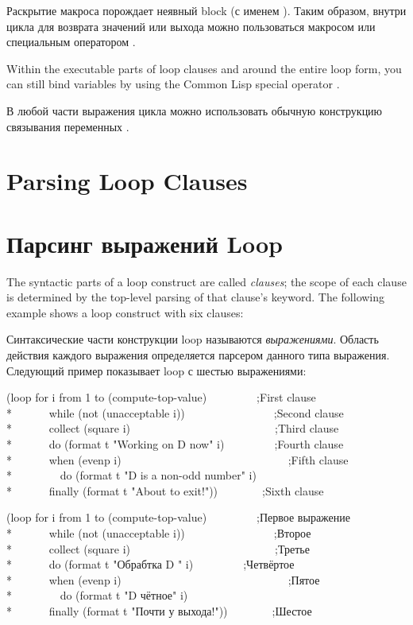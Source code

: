 Раскрытие макроса  порождает неявный block (с именем
). Таким образом, внутри цикла для возврата значений или
выхода можно пользоваться макросом  или специальным
оператором .

Within the executable parts of loop clauses and around the entire loop
form, you can still bind variables by using the Common Lisp special
operator .

В любой части выражения цикла можно использовать обычную конструкцию
связывания переменных .


\section{Parsing Loop Clauses}

\section{Парсинг выражений Loop}

The syntactic parts of a loop construct are called \emph{clauses}; the
scope of each clause is determined by the top-level parsing of that
clause's keyword.  The following example shows a loop construct with
six clauses:

Синтаксические части конструкции loop называются
\emph{выражениями}. Область действия каждого выражения определяется
парсером данного типа выражения. Следующий пример показывает loop с
шестью выражениями:

\begin{lisp} (loop for i from 1 to (compute-top-value)~~~~~~~~~;\textrm{First clause} \\*
~~~~~~while (not (unacceptable i))~~~~~~~~~~~~~~~~;\textrm{Second clause} \\*
~~~~~~collect (square i)~~~~~~~~~~~~~~~~~~~~~~~~~~;\textrm{Third clause} \\* 
~~~~~~do (format t "Working on {\Xtilde}D now" i)~~~~~~~~~;\textrm{Fourth clause} \\* 
~~~~~~when (evenp i)~~~~~~~~~~~~~~~~~~~~~~~~~~~~~~;\textrm{Fifth clause} \\* 
~~~~~~~~do (format t "{\Xtilde}D is a non-odd number" i) \\* 
~~~~~~finally (format t "About to exit!"))~~~~~~~~;\textrm{Sixth clause}
\end{lisp}

\begin{lisp} (loop for i from 1 to (compute-top-value)~~~~~~~~~;\textrm{Первое выражение} \\*
~~~~~~while (not (unacceptable i))~~~~~~~~~~~~~~~~;\textrm{Второе} \\*
~~~~~~collect (square i)~~~~~~~~~~~~~~~~~~~~~~~~~~;\textrm{Третье} \\*
~~~~~~do (format t "Обрабтка {\Xtilde}D " i)~~~~~~~~~;\textrm{Четвёртое} \\*
~~~~~~when (evenp i)~~~~~~~~~~~~~~~~~~~~~~~~~~~~~~;\textrm{Пятое} \\* 
~~~~~~~~do (format t "{\Xtilde}D чётное" i) \\* 
~~~~~~finally (format t "Почти у выхода!"))~~~~~~~~;\textrm{Шестое}
\end{lisp}


